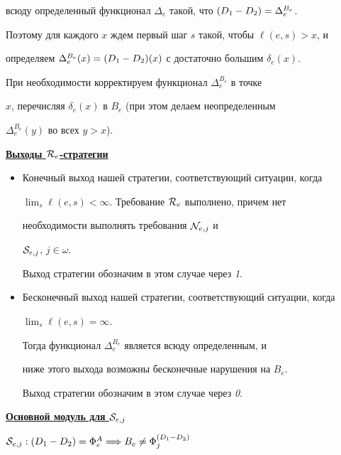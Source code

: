 всюду определенный функционал $\Delta_e$ такой, что $\draz=\Delta_e^{B_e}$.


Поэтому для каждого $x$ ждем первый шаг $s$ такой, чтобы $\ell(e,s)>x$, и


определяем $\Delta_e^{B_e}(x)=\draz(x)$ с достаточно большим $\delta_e(x)$.


При необходимости корректируем функционал $\Delta_e^{B_e}$ в точке


$x$, перечисляя $\delta_e(x)$ в $B_e$ (при этом делаем неопределенным


$\Delta_e^{B_e}(y)$ во всех $y>x$).





\underline{\bf Выходы ${\cal R}_e$-стратегии}





\begin{itemize}


\item[1)] Конечный выход нашей стратегии, соответствующий ситуации, когда


$\lim_s\ell(e,s)<\infty$. Требование ${\cal R}_e$ выполнено, причем нет


необходимости выполнять требования ${\cal N}_{e,j}$ и


${\cal S}_{e,j}$, $j\in\omega$.


Выход стратегии обозначим в этом случае через {\it 1}.


\item[2)] Бесконечный выход нашей стратегии, соответствующий ситуации, когда


$\lim_s\ell(e,s)=\infty$.


Тогда функционал $\Delta_e^{B_e}$ является всюду определенным, и


ниже этого выхода возможны бесконечные нарушения на $B_e$.


Выход стратегии обозначим в этом случае через {\it 0}.


\end{itemize}





\underline{\bf Основной модуль для ${\cal S}_{e,j}$}





\noindent $\req{S}{{e,j}}:\draz=\Phi_e^A\Longrightarrow B_e\neq\Phi_j^{\draz}$





